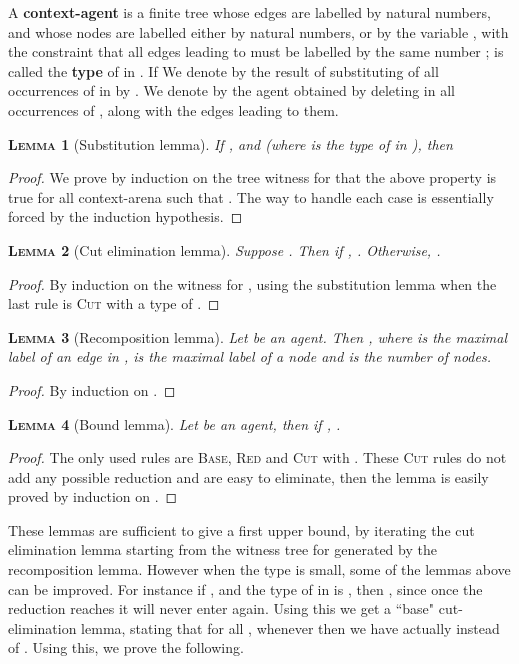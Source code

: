 \documentclass{article}
\newtheorem{lemma}{\textsc{Lemma}}
\begin{document}
A \textbf{context-agent}  is a finite tree whose edges are labelled by natural numbers, and whose nodes are labelled either by natural numbers, or by the variable , with the constraint that
all edges leading to  must be labelled by the same number ;  is called the \textbf{type} of  in . If
We denote by  the result of substituting of all occurrences of  in  by . We denote by  the agent obtained by deleting in 
all occurrences of , along with the edges leading to them.


\begin{lemma}[Substitution lemma]
If ,  and  (where  is the type of  in ), then 
\label{main_substitution}
\end{lemma}
\begin{proof}
We prove by induction on the tree witness for  that the above property is true for all context-arena  such that . The way
to handle each case is essentially forced by the induction hypothesis.
\end{proof}

\begin{lemma}[Cut elimination lemma]
Suppose . Then if , . Otherwise, .
\end{lemma}
\begin{proof}
By induction on the witness for , using the substitution lemma when the last rule is \textsc{Cut} with a type of .
\end{proof}

\begin{lemma}[Recomposition lemma]
Let  be an agent. Then , where  is the maximal label of an edge in ,  is the maximal label of a node and  is the number of nodes.
\end{lemma}
\begin{proof}
By induction on .
\end{proof}

\begin{lemma}[Bound lemma]
Let  be an agent, then if , .
\end{lemma}
\begin{proof}
The only used rules are \textsc{Base}, \textsc{Red} and \textsc{Cut} with . These \textsc{Cut} rules do not add any possible reduction and are easy to eliminate, then the lemma
is easily proved by induction on .
\end{proof}

These lemmas are sufficient to give a first upper bound, by iterating the cut elimination lemma starting from the witness tree for  generated by the recomposition lemma. However when the
type is small, some of the lemmas above can be improved. For instance if ,  and the type of  in  is , then , 
since once the reduction reaches  it will never enter  again. Using this we get a ``base" cut-elimination lemma, stating that for all , whenever  then we have actually 
 instead of . Using this, we prove the following.
\end{document}

